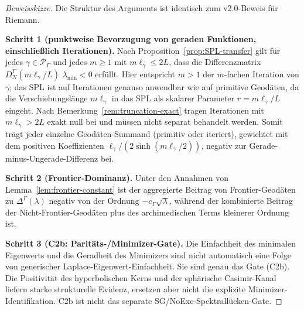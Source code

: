\documentclass[12pt,a4paper]{article}
\theoremstyle{definition}
\theoremstyle{remark}
\begin{document}
\begin{proof}[Beweisskizze]
Die Struktur des Arguments ist identisch zum v2.0-Beweis für Riemann.

\smallskip\noindent
\textbf{Schritt 1 (punktweise Bevorzugung von geraden Funktionen, einschließlich Iterationen).} Nach
Proposition~\ref{prop:SPL-transfer} gilt für jedes $\gamma \in \mathcal{P}_\Gamma$
und jedes $m \ge 1$ mit $m\ell_\gamma \le 2L$, dass die Differenzmatrix
$D^\Gamma_N(m\ell_\gamma / L)$ $\lambda_{\min} < 0$ erfüllt.  Hier entspricht $m > 1$
der $m$-fachen Iteration von $\gamma$; das SPL ist auf Iterationen genauso
anwendbar wie auf primitive Geodäten, da die Verschiebungslänge $m\ell_\gamma$ in das SPL als skalarer
Parameter $r = m\ell_\gamma/L$ eingeht.
Nach Bemerkung~\ref{rem:truncation-exact} tragen Iterationen mit $m\ell_\gamma > 2L$
exakt null bei und müssen nicht separat behandelt werden.  Somit trägt jeder einzelne
Geodäten-Summand (primitiv oder iteriert), gewichtet mit dem positiven Koeffizienten
$\ell_\gamma/(2\sinh(m\ell_\gamma/2))$, negativ zur Gerade-minus-Ungerade-Differenz bei.

\smallskip\noindent
\textbf{Schritt 2 (Frontier-Dominanz).} Unter den Annahmen von
Lemma~\ref{lem:frontier-constant} ist der aggregierte Beitrag von
Frontier-Geodäten zu $\Delta^\Gamma(\lambda)$ negativ von der Ordnung
$-c_\Gamma \sqrt{\lambda}$, während der kombinierte Beitrag der
Nicht-Frontier-Geodäten plus des archimedischen Terms kleinerer Ordnung ist.

\smallskip\noindent
\textbf{Schritt 3 (C2b: Paritäts-/Minimizer-Gate).} Die Einfachheit des minimalen
Eigenwerts und die Geradheit des Minimizers sind nicht automatisch eine Folge
von generischer Laplace-Eigenwert-Einfachheit. Sie sind genau das Gate (C2b).
Die Positivität des hyperbolischen Kerns und der sphärische Casimir-Kanal
liefern starke strukturelle Evidenz, ersetzen aber nicht die explizite
Minimizer-Identifikation. C2b ist nicht das separate SG/NoExc-Spektrallücken-Gate.


\end{proof}
\end{document}
